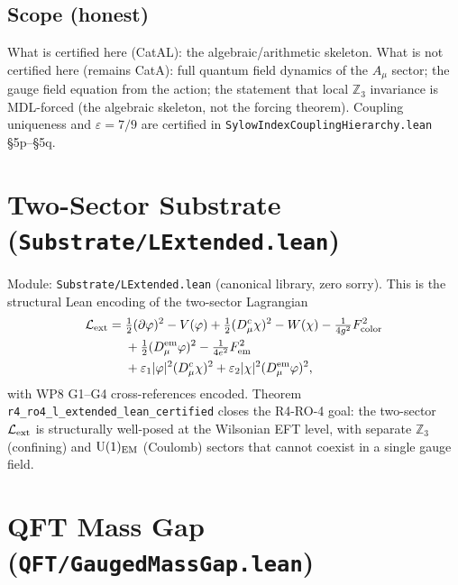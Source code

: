 \documentclass[11pt,a4paper]{article}
\theoremstyle{definition}
\begin{document}
\subsection*{Scope (honest)}
What is certified here (CatAL): the algebraic/arithmetic skeleton.
What is not certified here (remains CatA): full quantum field dynamics of
the $A_\mu$ sector; the gauge field equation from the action; the statement
that local $\mathbb{Z}_3$ invariance is MDL-forced (the algebraic skeleton,
not the forcing theorem).  Coupling uniqueness and $\varepsilon = 7/9$ are
certified in \texttt{SylowIndexCouplingHierarchy.lean} §5p–§5q.

\section{Two-Sector Substrate
  (\texttt{Substrate/LExtended.lean})}\label{sec:lextended}

Module: \texttt{Substrate/LExtended.lean} (canonical library, zero sorry).
This is the structural Lean encoding of the two-sector Lagrangian
\begin{equation}\label{eq:l-extended}
\begin{split}
\mathcal{L}_{\rm ext} =\; &
  \tfrac{1}{2}(\partial\varphi)^2 - V(\varphi)
  + \tfrac{1}{2}(D^c_\mu\chi)^2 - W(\chi)
  - \tfrac{1}{4g^2}F_{\rm color}^2 \\
  &+ \tfrac{1}{2}(D^{\rm em}_\mu\varphi)^2
  - \tfrac{1}{4e^2}F_{\rm em}^2 \\
  &+ \varepsilon_1|\varphi|^2(D^c_\mu\chi)^2
  + \varepsilon_2|\chi|^2(D^{\rm em}_\mu\varphi)^2,
\end{split}
\end{equation}
with WP8 G1–G4 cross-references encoded.
Theorem \lstinline|r4_ro4_l_extended_lean_certified| closes the R4-RO-4 goal:
the two-sector $\mathcal{L}_{\rm ext}$ is structurally well-posed at the
Wilsonian EFT level, with separate $\mathbb{Z}_3$ (confining) and $\mathrm{U}(1)_{\rm EM}$
(Coulomb) sectors that cannot coexist in a single gauge field.

\section[QFT Mass Gap]{QFT Mass Gap
  (\texttt{QFT/GaugedMassGap.lean})}\label{sec:qft-mass-gap}
\end{document}
